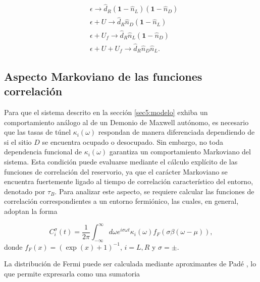 \begin{appendixs}
\begin{align*}
    &\epsilon \to \hat{d}_{R}(\textbf{1}-\hat{n}_{L})(\textbf{1}-\hat{n}_{D})\\
   &\epsilon + U \to \hat{d}_{R}\hat{n}_{D}(\textbf{1}-\hat{n}_{L})\\
    &\epsilon +U_{f}\to \hat{d}_{R}\hat{n}_{L}(\textbf{1}-\hat{n}_{D})\\
    &\epsilon +U+U_{f}\to \hat{d}_{R}\hat{n}_{D}\hat{n}_{L}.
\end{align*}

\label{apendix5frecuencygroup}



\subsection{Aspecto Markoviano de las funciones correlación}
Para que el sistema descrito en la sección \ref{sec5:modelo} exhiba un comportamiento análogo al de un Demonio de Maxwell autónomo, es necesario que las tasas de túnel $\kappa_{i}(\omega)$ respondan de manera diferenciada dependiendo de si el sitio $D$ se encuentra ocupado o desocupado. Sin embargo, no toda dependencia funcional de $\kappa_{i}(\omega)$ garantiza un comportamiento Markoviano del sistema. Esta condición puede evaluarse mediante el cálculo explícito de las funciones de correlación del reservorio, ya que el carácter Markoviano se encuentra fuertemente ligado al tiempo de correlación característico del entorno, denotado por $\tau_{B}$. Para analizar este aspecto, se requiere calcular las funciones de correlación correspondientes a un entorno fermiónico, las cuales, en general, adoptan la forma

\begin{equation*}
    C^{\sigma}_{i}(t) = \frac{1}{2\pi} \int_{-\infty}^{\infty} d\omega e^{i\sigma \omega t} \kappa_{i}(\omega) f_{F}(\sigma \beta(\omega-\mu)),
\end{equation*}
donde $f_{F}(x) = (\exp(x)+1)^{-1}$, $i= L,R$ y $\sigma = \pm$. 

La distribución de Fermi puede ser calculada mediante aproximantes de Padé \cite{hu2011pade,schinabeck2019hierarchical}, lo que permite expresarla como una sumatoria 


\end{appendixs}
